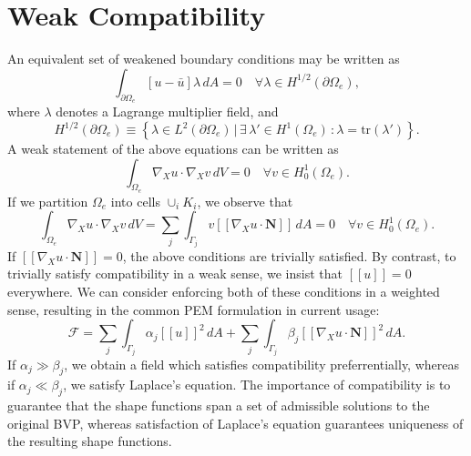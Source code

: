 \documentclass[12pt]{article}
\begin{document}
\section{Weak Compatibility}

An equivalent set of weakened boundary conditions may be written as
\begin{equation}
	\int_{\partial \Omega_e} \left[ u - \bar{u} \right] \lambda \, dA = 0 \quad \forall \lambda \in H^{1/2} (\partial \Omega_e),
\end{equation}
where $\lambda$ denotes a Lagrange multiplier field, and
\begin{equation}
	H^{1/2} (\partial \Omega_e) \equiv \left\{ \lambda \in L^2 (\partial \Omega_e) \, | \, \exists \, \lambda' \in H^1 (\Omega_e) \, \colon \lambda = \text{tr} (\lambda') \right\}.
\end{equation}
A weak statement of the above equations can be written as
\begin{equation}
	\int_{\Omega_e} \nabla_X u \cdot \nabla_X v \, dV = 0 \quad \forall v \in H^1_0(\Omega_e).
\end{equation}
If we partition $\Omega_e$ into cells $\cup_i K_i$, we observe that
\begin{equation}
	\int_{\Omega_e} \nabla_X u \cdot \nabla_X v \, dV = \sum_j \int_{\Gamma_j} v [\![ \nabla_X u \cdot \mathbf{N} ]\!] \, dA = 0 \quad \forall v \in H^1_0(\Omega_e).
\end{equation}
If $[\![ \nabla_X u \cdot \mathbf{N} ]\!] = 0$, the above conditions are trivially satisfied. By contrast, to trivially satisfy compatibility in a weak sense, we insist that $[\![ u ]\!] = 0$ everywhere. We can consider enforcing both of these conditions in a weighted sense, resulting in the common PEM formulation in current usage:
\begin{equation}
	\mathcal{F} = \sum_j \int_{\Gamma_j} \alpha_j [\![ u]\!]^2 \, dA + \sum_j \int_{\Gamma_j} \beta_j [\![ \nabla_X u \cdot \mathbf{N} ]\!]^2 \, dA.
\end{equation}
If $\alpha_j \gg \beta_j$, we obtain a field which satisfies compatibility preferrentially, whereas if $\alpha_j \ll \beta_j$, we satisfy Laplace's equation. The importance of compatibility is to guarantee that the shape functions span a set of admissible solutions to the original BVP, whereas satisfaction of Laplace's equation guarantees uniqueness of the resulting shape functions.
\end{document}
